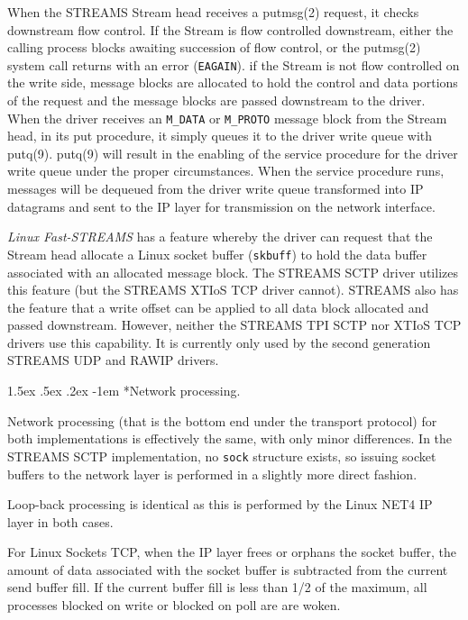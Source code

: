 \documentclass[letterpaper,final,notitlepage,twocolumn,10pt,twoside]{article}
\makeatletter
\renewcommand\paragraph{\@startsection{paragraph}{4}{\z@}%
                                    {1.5ex \@plus .5ex \@minus .2ex}%
                                    {-1em}%
                                    {\normalfont\normalsize\bfseries\slshape}}
\makeatother
\begin{document}
When the STREAMS Stream head receives a putmsg(2) request, it checks downstream flow control.  If
the Stream is flow controlled downstream, either the calling process blocks awaiting succession of
flow control, or the putmsg(2) system call returns with an error (\texttt{EAGAIN}).  if the Stream
is not flow controlled on the write side, message blocks are allocated to hold the control and data
portions of the request and the message blocks are passed downstream to the driver.  When the driver
receives an \texttt{M\_DATA} or \texttt{M\_PROTO} message block from the Stream head, in its put
procedure, it simply queues it to the driver write queue with putq(9).  putq(9) will result in the
enabling of the service procedure for the driver write queue under the proper circumstances.  When
the service procedure runs, messages will be dequeued from the driver write queue transformed into
IP datagrams and sent to the IP layer for transmission on the network interface.

\textsl{Linux Fast-STREAMS} has a feature whereby the driver can request that the Stream head
allocate a Linux socket buffer (\texttt{skbuff}) to hold the data buffer associated with an
allocated message block.  The STREAMS SCTP driver utilizes this feature (but the STREAMS XTIoS TCP
driver cannot).  STREAMS also has the feature that a write offset can be applied to all data block
allocated and passed downstream.  However, neither the STREAMS TPI SCTP nor XTIoS TCP drivers use
this capability.  It is currently only used by the second generation STREAMS UDP and RAWIP drivers.

\paragraph*{Network processing.}

Network processing (that is the bottom end under the transport protocol) for both implementations is
effectively the same, with only minor differences.  In the STREAMS SCTP implementation, no
\texttt{sock} structure exists, so issuing socket buffers to the network layer is performed in a
slightly more direct fashion.

Loop-back processing is identical as this is performed by the Linux NET4 IP layer in both cases.

For Linux Sockets TCP, when the IP layer frees or orphans the socket buffer, the amount of data
associated with the socket buffer is subtracted from the current send buffer fill.  If the current
buffer fill is less than 1/2 of the maximum, all processes blocked on write or blocked on poll are
are woken.
\end{document}
